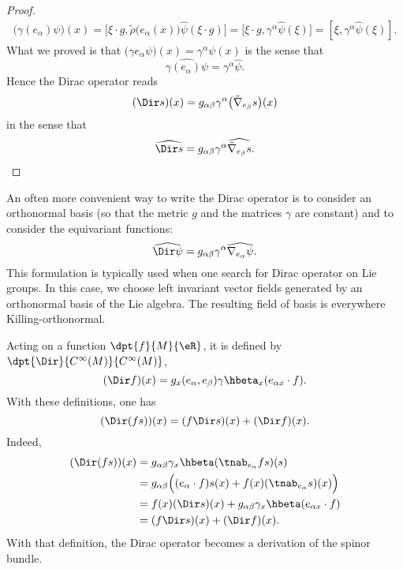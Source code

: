 \begin{proof}
\begin{align}
		\big( \gamma(e_{\alpha})\psi \big)(x)=\big[ \xi\cdot g,\tilde\rho\big( e_{\alpha}(x) \big)\hat{\psi}(\xi\cdot g) \big]
		=\big[ \xi\cdot g,\gamma^{\alpha}\hat{\psi}(\xi) \big]
		=[\xi,\gamma^{\alpha}\hat{\psi}(\xi)].
	\end{align}
	What we proved is that $\big( \gamma e_{\alpha}\psi \big)(x)=\gamma^{\alpha}\psi(x)$ is the sense that
	\begin{equation}
		\widehat{\gamma(e_{\alpha})\psi}=\gamma^{\alpha}\hat{\psi}.
	\end{equation}
	Hence the Dirac operator reads
	\[
		(\Dir s)(x)=g_{\alpha\beta}\gamma^{\alpha}\big( \tilde\nabla_{e_{\beta}}s \big)(x)
	\]
	in the sense that
	\begin{equation}
		\widehat{\Dir s}=g_{\alpha\beta}\gamma^{\alpha}\widehat{  \tilde\nabla_{e_{\beta}}s }.
	\end{equation}

\end{proof}


An often more convenient way to write the Dirac operator is to consider an orthonormal basis (so that the metric $g$ and the matrices $\gamma$ are constant) and to consider the equivariant functions:
\[
	\widehat{\Dir\psi}=g_{\alpha\beta}\gamma^{\alpha}\widehat{\nabla_{e_{\alpha}}\psi}.
\]
This formulation is typically used when one search for Dirac operator on Lie groups. In this case, we choose left invariant vector fields generated by an orthonormal basis of the Lie algebra. The resulting field of basis is everywhere Killing-orthonormal.

Acting on a function $\dpt{f}{M}{\eR}$, it is defined by $\dpt{\Dir}{C^{\infty}(M)}{C^{\infty}(M)}$,
\begin{equation} \label{eq_defDirac_f}
	(\Dir f)(x)=g_x(e_{\alpha},e_{\beta})\gamma\hbeta_x(e_{\alpha x}\cdot f).
\end{equation}
With these definitions, one has
\[(\Dir(fs))(x)=(f\Dir s)(x)+(\Dir f)(x).\] Indeed,
\begin{equation}
	\begin{split}
		(\Dir(fs))(x)&=g_{\alpha\beta}\gamma_x\hbeta(\tnab_{e_{\alpha}}fs)(s)\\
		&=g_{\alpha\beta}\Big((e_{\alpha}\cdot f)s(x)+f(x)(\tnab_{e_{\alpha}}s)(x)\Big)\\
		&=f(x)(\Dir s)(x)+g_{\alpha\beta}\gamma_x\hbeta(e_{\alpha x}\cdot f)\\
		&=(f\Dir s)(x)+(\Dir f)(x).
	\end{split}
\end{equation}
With that definition, the Dirac operator becomes a derivation of the spinor bundle.


